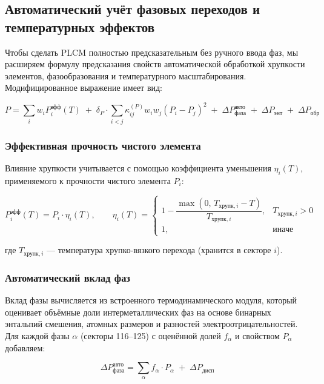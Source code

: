 \documentclass[12pt,a4paper]{article}
\begin{document}
	\subsection{Автоматический учёт фазовых переходов и температурных эффектов}
	\label{subsec:auto-phase}
	
	Чтобы сделать PLCM полностью предсказательным без ручного ввода фаз, мы расширяем формулу предсказания свойств автоматической обработкой хрупкости элементов, фазообразования и температурного масштабирования. Модифицированное выражение имеет вид:
	
	\begin{equation}
		\boxed{
			P = \sum_i w_i P_i^{\text{эфф}}(T) \;+\; \delta_P \cdot \sum_{i<j} \kappa_{ij}^{(P)} w_i w_j (P_i - P_j)^2 \;+\; \Delta P_{\text{фаза}}^{\text{авто}} \;+\; \Delta P_{\text{энт}} \;+\; \Delta P_{\text{обр}}
		}
		\label{eq:plcm-auto}
	\end{equation}
	
	\subsubsection{Эффективная прочность чистого элемента}
	Влияние хрупкости учитывается с помощью коэффициента уменьшения $\eta_i(T)$, применяемого к прочности чистого элемента $P_i$:
	
	\begin{equation}
		P_i^{\text{эфф}}(T) = P_i \cdot \eta_i(T), \qquad
		\eta_i(T) = 
		\begin{cases}
			1 - \dfrac{\max(0,\, T_{\text{хрупк},i} - T)}{T_{\text{хрупк},i}}, & T_{\text{хрупк},i} > 0 \\
			1, & \text{иначе}
		\end{cases}
	\end{equation}
	
	где $T_{\text{хрупк},i}$ — температура хрупко-вязкого перехода (хранится в секторе $i$).
	
	\subsubsection{Автоматический вклад фаз}
	Вклад фазы вычисляется из встроенного термодинамического модуля, который оценивает объёмные доли интерметаллических фаз на основе бинарных энтальпий смешения, атомных размеров и разностей электроотрицательностей. Для каждой фазы $\alpha$ (секторы 116–125) с оценённой долей $f_{\alpha}$ и свойством $P_{\alpha}$ добавляем:
	
	\begin{equation}
		\Delta P_{\text{фаза}}^{\text{авто}} = \sum_{\alpha} f_{\alpha} \cdot P_{\alpha} \;+\; \Delta P_{\text{дисп}}
	\end{equation}
	
\end{document}
